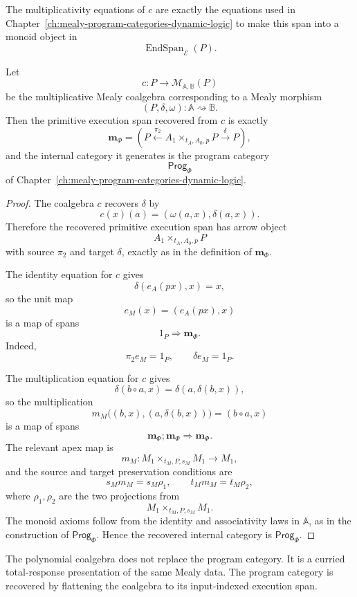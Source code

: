 The multiplicativity equations of \(c\) are exactly the equations used in
Chapter~\ref{ch:mealy-program-categories-dynamic-logic} to make this span
into a monoid object in
\[
\operatorname{EndSpan}_{\mathcal E}(P).
\]

\begin{theorem}
\label{thm:program-category-recovered-polynomial-coalgebra}
Let
\[
c:P\to\mathcal M_{\mathbb A,\mathbb B}(P)
\]
be the multiplicative Mealy coalgebra corresponding to a Mealy morphism
\[
(P,\delta,\omega):\mathbb A\rightsquigarrow\mathbb B.
\]
Then the primitive execution span recovered from \(c\) is exactly
\[
\mathbf m_\Phi
=
\left(
P
\xleftarrow{\pi_2}
A_1\times_{t_A,A_0,p}P
\xrightarrow{\delta}
P
\right),
\]
and the internal category it generates is the program category
\[
\mathsf{Prog}_\Phi
\]
of Chapter~\ref{ch:mealy-program-categories-dynamic-logic}.
\end{theorem}

\begin{proof}
The coalgebra \(c\) recovers \(\delta\) by
\[
c(x)(a)=(\omega(a,x),\delta(a,x)).
\]
Therefore the recovered primitive execution span has arrow object
\[
A_1\times_{t_A,A_0,p}P
\]
with source \(\pi_2\) and target \(\delta\), exactly as in the definition
of \(\mathbf m_\Phi\).

The identity equation for \(c\) gives
\[
\delta(e_A(px),x)=x,
\]
so the unit map
\[
e_M(x)=(e_A(px),x)
\]
is a map of spans
\[
1_P\Rightarrow \mathbf m_\Phi.
\]
Indeed,
\[
\pi_2 e_M=1_P,
\qquad
\delta e_M=1_P.
\]

The multiplication equation for \(c\) gives
\[
\delta(b\circ a,x)=\delta(a,\delta(b,x)),
\]
so the multiplication
\[
m_M\bigl((b,x),(a,\delta(b,x))\bigr)
=
(b\circ a,x)
\]
is a map of spans
\[
\mathbf m_\Phi;\mathbf m_\Phi\Rightarrow\mathbf m_\Phi.
\]
The relevant apex map is
\[
m_M:
M_1\times_{t_M,P,s_M}M_1\to M_1,
\]
and the source and target preservation conditions are
\[
s_M m_M=s_M\rho_1,
\qquad
t_M m_M=t_M\rho_2,
\]
where \(\rho_1,\rho_2\) are the two projections from
\[
M_1\times_{t_M,P,s_M}M_1.
\]
The monoid axioms follow from the identity and associativity laws in
\(\mathbb A\), as in the construction of \(\mathsf{Prog}_\Phi\).
Hence the recovered internal category is \(\mathsf{Prog}_\Phi\).
\end{proof}

\begin{remark}
\label{rem:coalgebra-does-not-replace-program-category}
The polynomial coalgebra does not replace the program category. It is a
curried total-response presentation of the same Mealy data. The program
category is recovered by flattening the coalgebra to its input-indexed
execution span.
\end{remark}

